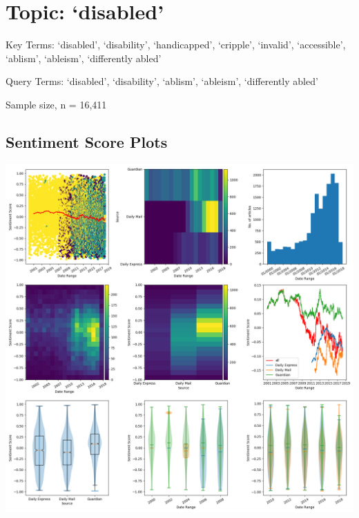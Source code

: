 \documentclass{report}
\begin{document}
\newpage
\section{Topic: `disabled'}
Key Terms: `disabled', `disability', `handicapped', `cripple', `invalid', `accessible', `ablism', `ableism', `differently abled'

\noindent Query Terms: `disabled', `disability', `ablism', `ableism', `differently abled'

\noindent Sample size, n = 16,411

\subsection{Sentiment Score Plots}
\includegraphics[width=\textwidth]{raw/disabled.png}
\end{document}
